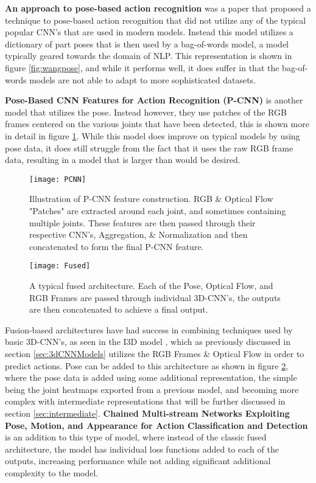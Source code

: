 \textbf{An approach to pose-based action recognition} \cite{WangPose} was a paper that proposed a technique to pose-based action recognition that did not utilize any of the typical popular CNN's that are used in modern models. Instead this model utilizes a dictionary of part poses that is then used by a bag-of-words model, a model typically geared towards the domain of NLP. This representation is shown in figure \ref{fig:wangpose}, and  while it performs well, it does suffer in that the bag-of-words models are not able to adapt to more sophisticated datasets.

\textbf{Pose-Based CNN Features for Action Recognition (P-CNN)} \cite{PCNN} is another model that utilizes the pose. Instead however, they use patches of the RGB frames centered on the various joints that have been detected, this is shown more in detail in figure \ref{fig:pcnn}. While this model does improve on typical models by using pose data, it does still struggle from the fact that it uses the raw RGB frame data, resulting in a model that is larger than would be desired.

\begin{figure}[ht]
	\texttt{[image: PCNN]}
	\centering
	\caption{Illustration of P-CNN \cite{PCNN} feature construction. RGB \& Optical Flow "Patches" are extracted around each joint, and sometimes containing multiple joints. These features are then passed through their respective CNN's, Aggregation, \& Normalization and then concatenated to form the final P-CNN feature.}
	\label{fig:pcnn}
\end{figure}

\begin{figure}[ht]
	\texttt{[image: Fused]}
	\centering
	\caption{A typical fused architecture. Each of the Pose, Optical Flow, and RGB Frames are passed through individual 3D-CNN's, the outputs are then concatenated to achieve a final output.}
	\label{fig:fused}
\end{figure}

Fusion-based architectures have had success in combining techniques used by basic 3D-CNN's, as seen in the I3D model \cite{i3d}, which as previously discussed in section \ref{sec:3dCNNModels} utilizes the RGB Frames \& Optical Flow in order to predict actions. Pose can be added to this architecture as shown in figure \ref{fig:fused}, where the pose data is added using some additional representation, the simple being the joint heatmaps exported from a previous model, and becoming more complex with intermediate representations that will be further discussed in section \ref{sec:intermediate}. \textbf{Chained Multi-stream Networks Exploiting Pose, Motion, and Appearance for Action Classification and Detection} \cite{Chained} is an addition to this type of model, where instead of the classic fused architecture, the model has individual loss functions added to each of the outputs, increasing performance while not adding significant additional complexity to the model.

